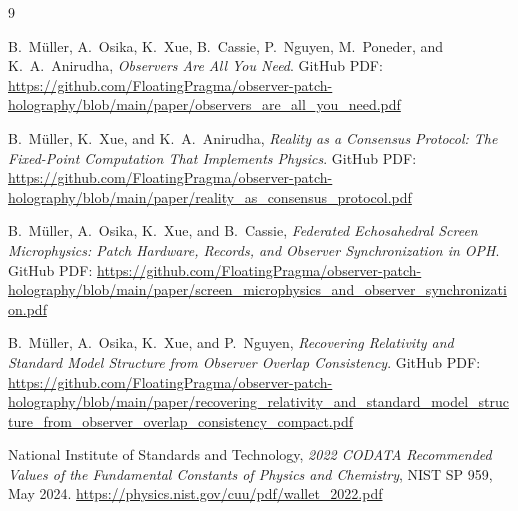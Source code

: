 \documentclass[11pt]{article}
\begin{document}
\begin{thebibliography}{9}

B.\ M\"uller, A.\ Osika, K.\ Xue, B.\ Cassie, P.\ Nguyen, M.\ Poneder, and K.\ A.\ Anirudha,
\emph{Observers Are All You Need}.
GitHub PDF:
\url{https://github.com/FloatingPragma/observer-patch-holography/blob/main/paper/observers_are_all_you_need.pdf}

B.\ M\"uller, K.\ Xue, and K.\ A.\ Anirudha,
\emph{Reality as a Consensus Protocol: The Fixed-Point Computation That Implements Physics}.
GitHub PDF:
\url{https://github.com/FloatingPragma/observer-patch-holography/blob/main/paper/reality_as_consensus_protocol.pdf}

B.\ M\"uller, A.\ Osika, K.\ Xue, and B.\ Cassie,
\emph{Federated Echosahedral Screen Microphysics: Patch Hardware, Records, and Observer Synchronization in OPH}.
GitHub PDF:
\url{https://github.com/FloatingPragma/observer-patch-holography/blob/main/paper/screen_microphysics_and_observer_synchronization.pdf}

B.\ M\"uller, A.\ Osika, K.\ Xue, and P.\ Nguyen,
\emph{Recovering Relativity and Standard Model Structure from Observer Overlap Consistency}.
GitHub PDF:
\url{https://github.com/FloatingPragma/observer-patch-holography/blob/main/paper/recovering_relativity_and_standard_model_structure_from_observer_overlap_consistency_compact.pdf}

National Institute of Standards and Technology,
\emph{2022 CODATA Recommended Values of the Fundamental Constants of Physics and Chemistry},
NIST SP 959, May 2024.
\url{https://physics.nist.gov/cuu/pdf/wallet_2022.pdf}

\end{thebibliography}
\end{document}
